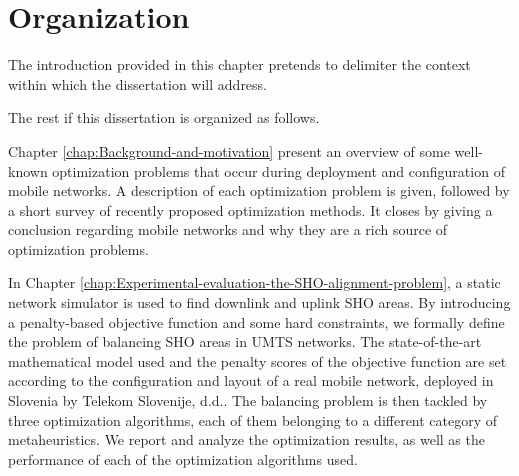\section{Organization}

The introduction provided in this chapter pretends to delimiter the
context within which the dissertation will address.

The rest if this dissertation is organized as follows.

Chapter \ref{chap:Background-and-motivation} present an overview
of some well-known optimization problems that occur during deployment
and configuration of mobile networks. A description of each optimization
problem is given, followed by a short survey of recently proposed
optimization methods. It closes by giving a conclusion regarding mobile
networks and why they are a rich source of optimization problems.

In Chapter \ref{chap:Experimental-evaluation-the-SHO-alignment-problem},
a static network simulator is used to find downlink and uplink SHO
areas. By introducing a penalty-based objective function and some
hard constraints, we formally define the problem of balancing SHO
areas in UMTS networks. The state-of-the-art mathematical model used
and the penalty scores of the objective function are set according
to the configuration and layout of a real mobile network, deployed
in Slovenia by Telekom Slovenije, d.d.. The balancing problem is then
tackled by three optimization algorithms, each of them belonging to
a different category of metaheuristics. We report and analyze the
optimization results, as well as the performance of each of the optimization
algorithms used.
